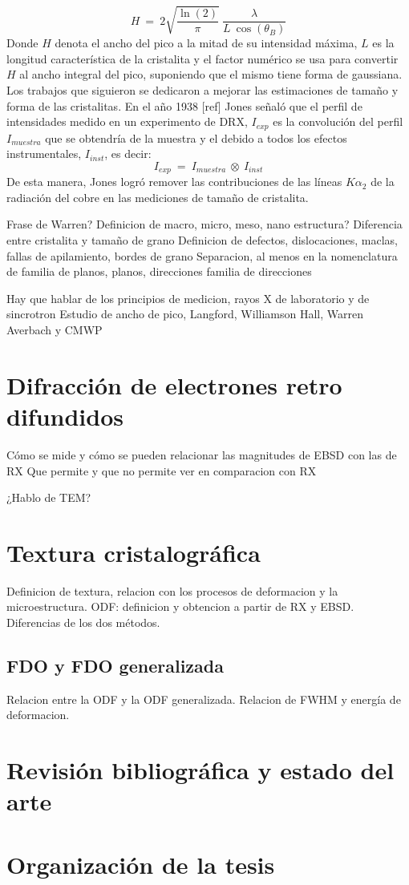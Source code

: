 \begin{equation}
  H \ = \ 2 \sqrt{\frac{\ln(2)}{\pi}} \ \frac{\lambda}{L \ \cos(\theta_B)}
  \label{eq:Scherrer}
\end{equation}
\noindent
Donde $H$ denota el ancho del pico a la mitad de su intensidad máxima, $L$ es la longitud característica de la cristalita y el factor numérico se usa para convertir $H$ al ancho integral del pico, suponiendo que el mismo tiene forma de gaussiana. 
Los trabajos que siguieron se dedicaron a mejorar las estimaciones de tamaño y forma de las cristalitas. 
En el año 1938 [ref] Jones señaló que el perfil de intensidades medido en un experimento de DRX, $I_{exp}$ es la convolución del perfil $I_{muestra}$ que se obtendría de la muestra y el debido a todos los efectos instrumentales, $I_{inst}$, es decir:
\begin{equation}
  I_{exp} \ = \ I_{muestra} \ \otimes \ I_{inst}
  \label{eq:conv}
\end{equation}
\noindent
De esta manera, Jones logró remover las contribuciones de las líneas $K\alpha_2$ de la radiación del cobre en las mediciones de tamaño de cristalita.



Frase de Warren?
Definicion de macro, micro, meso, nano estructura?
Diferencia entre cristalita y tamaño de grano
Definicion de defectos, dislocaciones, maclas, fallas de apilamiento, bordes de grano
Separacion, al menos en la nomenclatura de familia de planos, planos, direcciones familia de direcciones

Hay que hablar de los principios de medicion, rayos X de laboratorio y de sincrotron
Estudio de ancho de pico, Langford, Williamson Hall, Warren Averbach y CMWP

\section{Difracción de electrones retro difundidos}\label{S:EBSD}
Cómo se mide y cómo se pueden relacionar las magnitudes de EBSD con las de RX
Que permite y que no permite ver en comparacion con RX

¿Hablo de TEM?
 
\section{Textura cristalográfica}\label{S:Text}
Definicion de textura, relacion con los procesos de deformacion y la microestructura.
ODF: definicion y obtencion a partir de RX y EBSD. Diferencias de los dos métodos.

\subsection{FDO y FDO generalizada}\label{SS:ODF}
Relacion entre la ODF y la ODF generalizada. Relacion de FWHM y energía de deformacion.

\section{Revisión bibliográfica y estado del arte}\label{S:RB}

\section{Organización de la tesis}\label{S:Org}
